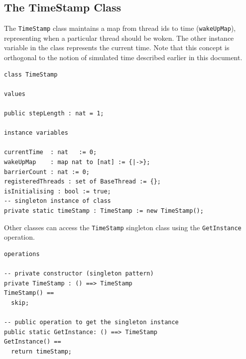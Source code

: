 \documentclass{overturerepchap}
\begin{document}
\subsection{The TimeStamp Class}

The \texttt{TimeStamp} class maintains a map from thread ids to 
time (\texttt{wakeUpMap}), representing when a particular thread 
should be woken. The other instance variable in the class
represents the current time. Note that this concept is orthogonal to
the notion of simulated time described earlier in this document.



\begin{lstlisting}
class TimeStamp

values

public stepLength : nat = 1;

instance variables

currentTime  : nat   := 0;
wakeUpMap    : map nat to [nat] := {|->};
barrierCount : nat := 0;
registeredThreads : set of BaseThread := {};
isInitialising : bool := true;
-- singleton instance of class
private static timeStamp : TimeStamp := new TimeStamp();
\end{lstlisting}

Other classes can access the \texttt{TimeStamp} singleton class using the \texttt{GetInstance} operation.

\begin{lstlisting}
operations

-- private constructor (singleton pattern)
private TimeStamp : () ==> TimeStamp
TimeStamp() ==
  skip;

-- public operation to get the singleton instance
public static GetInstance: () ==> TimeStamp
GetInstance() ==
  return timeStamp;
\end{lstlisting}
\end{document}
